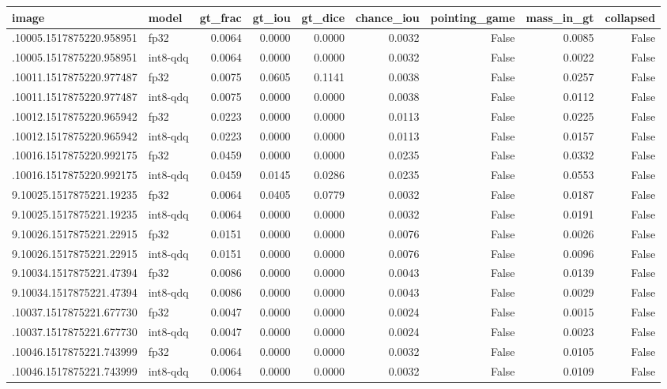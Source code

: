 \begin{tabular}{llrrrrrrr}
\toprule
image & model & gt\_frac & gt\_iou & gt\_dice & chance\_iou & pointing\_game & mass\_in\_gt & collapsed \\
\midrule
.10005.1517875220.958951 & fp32 & 0.0064 & 0.0000 & 0.0000 & 0.0032 & False & 0.0085 & False \\
.10005.1517875220.958951 & int8-qdq & 0.0064 & 0.0000 & 0.0000 & 0.0032 & False & 0.0022 & False \\
.10011.1517875220.977487 & fp32 & 0.0075 & 0.0605 & 0.1141 & 0.0038 & False & 0.0257 & False \\
.10011.1517875220.977487 & int8-qdq & 0.0075 & 0.0000 & 0.0000 & 0.0038 & False & 0.0112 & False \\
.10012.1517875220.965942 & fp32 & 0.0223 & 0.0000 & 0.0000 & 0.0113 & False & 0.0225 & False \\
.10012.1517875220.965942 & int8-qdq & 0.0223 & 0.0000 & 0.0000 & 0.0113 & False & 0.0157 & False \\
.10016.1517875220.992175 & fp32 & 0.0459 & 0.0000 & 0.0000 & 0.0235 & False & 0.0332 & False \\
.10016.1517875220.992175 & int8-qdq & 0.0459 & 0.0145 & 0.0286 & 0.0235 & False & 0.0553 & False \\
9.10025.1517875221.19235 & fp32 & 0.0064 & 0.0405 & 0.0779 & 0.0032 & False & 0.0187 & False \\
9.10025.1517875221.19235 & int8-qdq & 0.0064 & 0.0000 & 0.0000 & 0.0032 & False & 0.0191 & False \\
9.10026.1517875221.22915 & fp32 & 0.0151 & 0.0000 & 0.0000 & 0.0076 & False & 0.0026 & False \\
9.10026.1517875221.22915 & int8-qdq & 0.0151 & 0.0000 & 0.0000 & 0.0076 & False & 0.0096 & False \\
9.10034.1517875221.47394 & fp32 & 0.0086 & 0.0000 & 0.0000 & 0.0043 & False & 0.0139 & False \\
9.10034.1517875221.47394 & int8-qdq & 0.0086 & 0.0000 & 0.0000 & 0.0043 & False & 0.0029 & False \\
.10037.1517875221.677730 & fp32 & 0.0047 & 0.0000 & 0.0000 & 0.0024 & False & 0.0015 & False \\
.10037.1517875221.677730 & int8-qdq & 0.0047 & 0.0000 & 0.0000 & 0.0024 & False & 0.0023 & False \\
.10046.1517875221.743999 & fp32 & 0.0064 & 0.0000 & 0.0000 & 0.0032 & False & 0.0105 & False \\
.10046.1517875221.743999 & int8-qdq & 0.0064 & 0.0000 & 0.0000 & 0.0032 & False & 0.0109 & False \\

\end{tabular}
